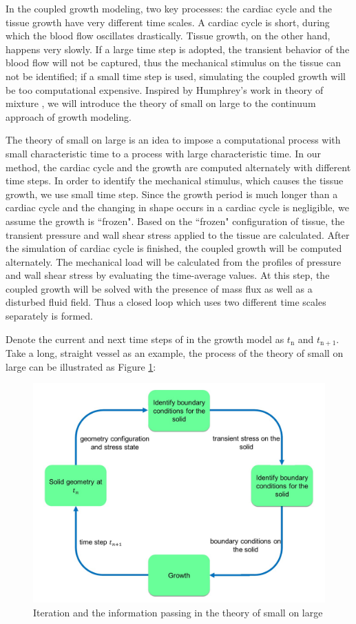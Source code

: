 In the coupled growth modeling, two key processes: the cardiac cycle and the tissue growth have very different time scales. A cardiac cycle is short, during which the blood flow oscillates drastically. Tissue growth, on the other hand, happens very slowly. If a large time step is adopted, the transient behavior of the blood flow will not be captured, thus the mechanical stimulus on the tissue can not be identified; if a small time step is used, simulating the coupled growth will be too computational expensive. Inspired by Humphrey's work in theory of mixture \cite{Baek}, we will introduce the theory of small on large to the continuum approach of growth modeling.

The theory of small on large is an idea to impose a computational process with small characteristic time to a process with large characteristic time. In our method, the cardiac cycle and the growth are computed alternately with different time steps. In order to identify the mechanical stimulus, which causes the tissue growth, we use small time step. Since the growth period is much longer than a cardiac cycle and the changing in shape occurs in a cardiac cycle is negligible, we assume the growth is ``frozen". Based on the ``frozen" configuration of tissue, the transient pressure and wall shear stress applied to the tissue are calculated. After the simulation of cardiac cycle is finished, the coupled growth will be computed alternately. The mechanical load will be calculated from the profiles of pressure and wall shear stress by evaluating the time-average values. At this step, the coupled growth will be solved with the presence of mass flux as well as a disturbed fluid field. Thus a closed loop which uses two different time scales separately is formed.

Denote the current and next time steps of in the growth model as $t_\mathrm{n}$ and $t_\mathrm{n+1}$. Take a long, straight vessel as an example, the process of the theory of small on large can be illustrated as Figure \ref{fig:smallOnLarge}:
\begin{figure}[H]
   \centering
   \includegraphics[width=.4\textwidth]{./figs/smallOnLarge.jpg} %
   \caption{Iteration and the information passing in the theory of small on large}
   \label{fig:smallOnLarge}
\end{figure}

